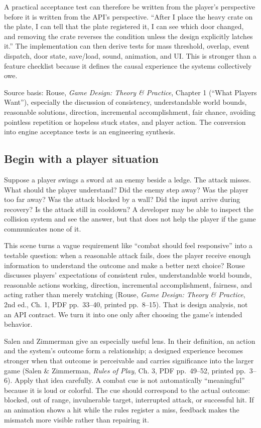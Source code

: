 A practical acceptance test can therefore be written from the player's perspective before it is written from the API's perspective. ``After I place the heavy crate on the plate, I can tell that the plate registered it, I can see which door changed, and removing the crate reverses the condition unless the design explicitly latches it.'' The implementation can then derive tests for mass threshold, overlap, event dispatch, door state, save/load, sound, animation, and UI. This is stronger than a feature checklist because it defines the causal experience the systems collectively owe.

Source basis: Rouse, \emph{Game Design: Theory \& Practice}, Chapter 1 (``What Players Want''), especially the discussion of consistency, understandable world bounds, reasonable solutions, direction, incremental accomplishment, fair chance, avoiding pointless repetition or hopeless stuck states, and player action. The conversion into engine acceptance tests is an engineering synthesis.

\subsection{Begin with a player situation}\label{05-engine-i-ch009-begin-with-a-player-situation}

Suppose a player swings a sword at an enemy beside a ledge. The attack misses. What should the player understand? Did the enemy step away? Was the player too far away? Was the attack blocked by a wall? Did the input arrive during recovery? Is the attack still in cooldown? A developer may be able to inspect the collision system and see the answer, but that does not help the player if the game communicates none of it.

This scene turns a vague requirement like ``combat should feel responsive'' into a testable question: when a reasonable attack fails, does the player receive enough information to understand the outcome and make a better next choice? Rouse discusses players' expectations of consistent rules, understandable world bounds, reasonable actions working, direction, incremental accomplishment, fairness, and acting rather than merely watching (Rouse, \emph{Game Design: Theory \& Practice}, 2nd ed., Ch. 1, PDF pp.~33--40, printed pp.~8--15). That is design analysis, not an API contract. We turn it into one only after choosing the game's intended behavior.

Salen and Zimmerman give an especially useful lens. In their definition, an action and the system's outcome form a relationship; a designed experience becomes stronger when that outcome is perceivable and carries significance into the larger game (Salen \& Zimmerman, \emph{Rules of Play}, Ch. 3, PDF pp.~49--52, printed pp.~3--6). Apply that idea carefully. A combat cue is not automatically ``meaningful'' because it is loud or colorful. The cue should correspond to the actual outcome: blocked, out of range, invulnerable target, interrupted attack, or successful hit. If an animation shows a hit while the rules register a miss, feedback makes the mismatch more visible rather than repairing it.


